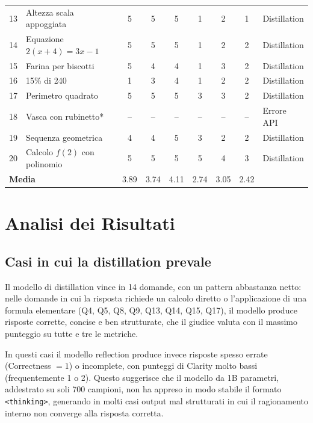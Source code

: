 \begin{table}[tbp]
{\begin{tabular}{clccccccl}
    13 & Altezza scala appoggiata      & 5 & 5 & 5 & 1 & 2 & 1 & Distillation \\
    14 & Equazione $2(x+4) = 3x-1$     & 5 & 5 & 5 & 1 & 2 & 2 & Distillation \\
    15 & Farina per biscotti           & 5 & 4 & 4 & 1 & 3 & 2 & Distillation \\
    16 & 15\% di 240                   & 1 & 3 & 4 & 1 & 2 & 2 & Distillation \\
    17 & Perimetro quadrato            & 5 & 5 & 5 & 3 & 3 & 2 & Distillation \\
    18 & Vasca con rubinetto*          & {--} & {--} & {--} & {--} & {--} & {--} & Errore API \\
    19 & Sequenza geometrica           & 4 & 4 & 5 & 3 & 2 & 2 & Distillation \\
    20 & Calcolo $f(2)$ con polinomio  & 5 & 5 & 5 & 5 & 4 & 3 & Distillation \\
    \midrule
    \multicolumn{2}{l}{\textbf{Media}} &
    3.89 & 3.74 & 4.11 & 2.74 & 3.05 & 2.42 & \\
    \bottomrule
  \end{tabular}}
\end{table}

\FloatBarrier
\section{Analisi dei Risultati}
\label{sec:analisi}

\subsection{Casi in cui la distillation prevale}

Il modello di distillation vince in 14 domande, con un pattern
abbastanza netto: nelle domande in cui la risposta richiede un calcolo
diretto o l'applicazione di una formula elementare (Q4, Q5, Q8, Q9,
Q13, Q14, Q15, Q17), il modello produce risposte corrette, concise
e ben strutturate, che il giudice valuta con il massimo punteggio
su tutte e tre le metriche.

In questi casi il modello reflection produce invece risposte
spesso errate (Correctness $= 1$) o incomplete, con punteggi di
Clarity molto bassi (frequentemente 1 o 2). Questo suggerisce che
il modello da 1B parametri, addestrato su soli 700 campioni, non
ha appreso in modo stabile il formato \texttt{<thinking>}, generando
in molti casi output mal strutturati in cui il ragionamento interno
non converge alla risposta corretta.

